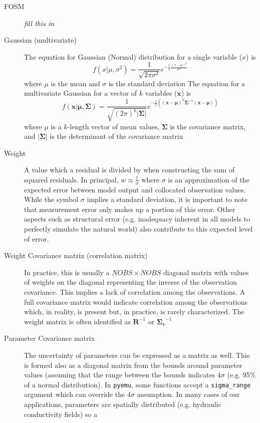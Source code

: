 \documentclass[english]{article}
\begin{document}
\begin{description}
\item [FOSM] \emph{fill this in}
\item [Gaussian (multivariate)] The equation for Gaussian (Normal) distribution for a single variable ($x$) is 
\begin{equation}
f(x|\mu,\sigma^2)=\frac{1}{\sqrt{2\pi\sigma^2}}e^{-\frac{1}{2}\frac{\left(x-\mu\right)^2}{\sigma^2}}
\end{equation}
where $\mu$ is the mean and $\sigma$ is the standard deviation
The equation for a multivariate Gaussian for a vector of $k$ variables ($\mathbf{x}$) is
\begin{equation}
f(\mathbf{x} | \mathbf{\mu},\mathbf{\Sigma})=\frac{1}{\sqrt{(2\pi)^k\left|\mathbf{\Sigma}\right|}}e^{-\frac{1}{2}\left( \left(\mathbf{x}-\mathbf{\mu} \right)^T  \mathbf{\Sigma}^{-1}\left(\mathbf{x}-\mathbf{\mu} \right)\right)}
\end{equation}
where $\mu$ is a $k$-length vector of mean values, $\mathbf{\Sigma}$ is the covariance matrix, and $\left|\mathbf{\Sigma}\right|$ is the determinant of the covariance matrix
\item [Weight] A value which a residual is divided by when constructing the sum of squared residuals. In principal, $w\approx\frac{1}{\sigma}$ where $\sigma$ is an approximation of the expected error between model output and collocated observation values. While the symbol $\sigma$ implies a standard deviation, it is important to note that measurement error only makes up a portion of this error. Other aspects such as structural error (e.g. inadequacy inherent in all models to perfectly simulate the natural world) also contribute to this expected level of error.
\item [Weight Covariance matrix (correlation matrix)] In practice, this is usually a $NOBS\times NOBS$ diagonal matrix with values of weights on the diagonal representing the inverse of the observation covariance. This implies a lack of correlation among the observations. A full covariance matrix would indicate correlation among the observations which, in reality, is present but, in practice, is rarely characterized. The weight matrix is often identified as $\mathbf{R}^{-1}$ or $\mathbf{\Sigma_\epsilon}^{-1}$
\item [Parameter Covariance matrix] The uncertainty of parameters can be expressed as a matrix as well. This is formed also as a diagonal matrix from the bounds around parameter values (assuming that the range between the bounds indicates $4\sigma$ (e.g. 95\% of a normal distribution). In \texttt{pyemu}, some functions accept a \texttt{sigma\_range} argument which can override the $4\sigma$ assumption. In many cases of our applications, parameters are spatially distributed (e.g. hydraulic conductivity fields) so a 

\end{description}
\end{document}

